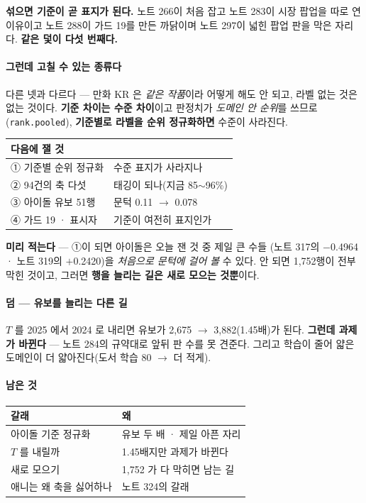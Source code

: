 \documentclass[10pt]{article}
\begin{document}
\textbf{섞으면 기준이 곧 표지가 된다.} 노트 266이 처음 잡고 노트 283이 시장
팝업을 따로 연 이유이고 노트 288이 가드 19를 만든 까닭이며 노트 297이
넓힌 팝업 판을 막은 자리다. \textbf{같은 덫이 다섯 번째다.}

\paragraph{그런데 고칠 수 있는 종류다} 다른 넷과 다르다 --- 만화 KR 은
\emph{같은 작품}이라 어떻게 해도 안 되고, 라벨 없는 것은 없는 것이다.
\textbf{기준 차이는 수준 차이}이고 판정치가 \emph{도메인 안 순위}를 쓰므로
(\texttt{rank.pooled}), \textbf{기준별로 라벨을 순위 정규화하면} 수준이
사라진다.

\begin{center}\footnotesize
\begin{tabular}{ll}
\hline
다음에 잴 것 & \\
\hline
① 기준별 순위 정규화 & 수준 표지가 사라지나 \\
② 94건의 축 다섯 & 태깅이 되나(지금 85$\sim$96\%) \\
③ 아이돌 유보 51행 & 문턱 0.11 $\to$ 0.078 \\
④ 가드 19 · 표시자 & 기준이 여전히 표지인가 \\
\hline
\end{tabular}
\end{center}

\textbf{미리 적는다} --- ①이 되면 아이돌은 오늘 잰 것 중 제일 큰 수들
(노트 317의 $-$0.4964 · 노트 319의 $+$0.2420)을 \emph{처음으로 문턱에
걸어 볼} 수 있다. 안 되면 1,752행이 전부 막힌 것이고, 그러면
\textbf{행을 늘리는 길은 새로 모으는 것뿐}이다.

\paragraph{덤 --- 유보를 늘리는 다른 길} $T$ 를 2025 에서 2024 로 내리면
유보가 2,675 $\to$ 3,882(1.45배)가 된다. \textbf{그런데 과제가 바뀐다}
--- 노트 284의 규약대로 앞뒤 판 수를 못 견준다. 그리고 학습이 줄어 얇은
도메인이 더 얇아진다(도서 학습 80 $\to$ 더 적게).

\paragraph{남은 것}
\begin{center}\small
\begin{tabular}{ll}
\hline
갈래 & 왜 \\
\hline
아이돌 기준 정규화 & 유보 두 배 · 제일 아픈 자리 \\
$T$ 를 내릴까 & 1.45배지만 과제가 바뀐다 \\
새로 모으기 & 1,752 가 다 막히면 남는 길 \\
애니는 왜 축을 싫어하나 & 노트 324의 갈래 \\
\hline
\end{tabular}
\end{center}
\end{document}
